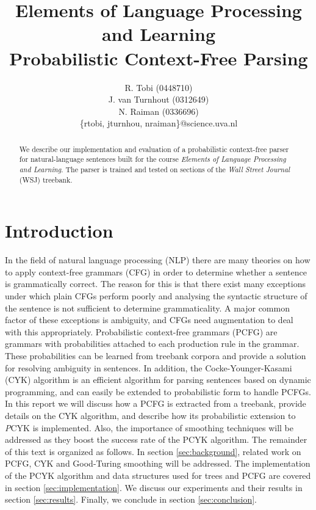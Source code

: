 \documentclass[11pt,twocolumn]{article}
\title{Elements of Language Processing and Learning\\Probabilistic Context-Free Parsing}
\author{R. Tobi (0448710) \\ J. van Turnhout (0312649) \\ N. Raiman (0336696) \\ \{rtobi, jturnhou, nraiman\}@science.uva.nl}
\begin{document}
	\maketitle

	\begin{abstract}
		We describe our implementation and evaluation of a probabilistic context-free
		parser for natural-language sentences built for the course \textit{Elements of
		Language Processing and Learning}. The parser is trained and tested on sections
		of the \textit{Wall Street Journal} (WSJ) treebank.
	\end{abstract}


	\section{Introduction}
		In the field of natural language processing (NLP) there are many theories on how
		to apply context-free grammars (CFG) in order to determine whether a sentence
		is grammatically correct. The reason for this is that there exist many exceptions
		under which plain CFGs perform poorly and analysing the syntactic structure of the
		sentence is not sufficient to determine grammaticality. A major common factor of
		these exceptions is ambiguity, and CFGs need augmentation to deal with this
		appropriately. Probabilistic context-free grammars (PCFG) are grammars with
		probabilities attached to each production rule in the grammar. These
		probabilities can be learned from treebank corpora and provide a solution
		for resolving ambiguity in sentences. In addition, the Cocke-Younger-Kasami
		(CYK) algorithm is an efficient algorithm for parsing sentences based on
		dynamic programming, and can easily be extended to probabilistic form to handle
		PCFGs. In this report we will discuss how a PCFG is extracted from a treebank,
		provide details on the CYK algorithm, and describe how its probabilistic extension
		to \textit{P}CYK is implemented. Also, the importance of smoothing techniques will
		be addressed as they boost the success rate of the PCYK algorithm. The remainder of
		this text is organized as follows. In section \ref{sec:background}, related work on
		PCFG, CYK and Good-Turing smoothing will be addressed. The implementation of the PCYK
		algorithm and data structures used for trees and PCFG are covered in section
		\ref{sec:implementation}. We discuss our experiments and their results in section
		\ref{sec:results}. Finally, we conclude in section \ref{sec:conclusion}.
	
\end{document}
